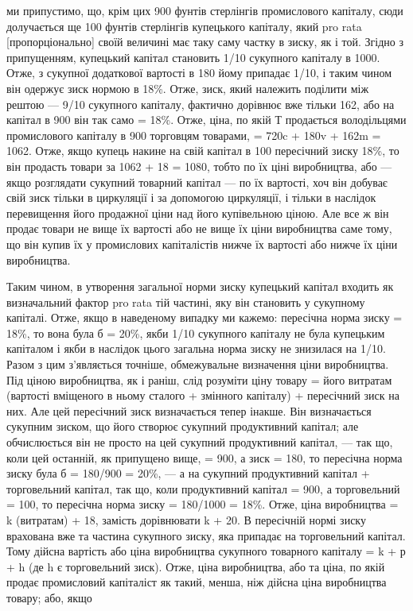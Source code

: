 ми припустимо, що, крім цих 900 фунтів стерлінгів промислового
капіталу, сюди долучається ще 100 фунтів стерлінгів купецького
капіталу, який pro rata [пропорціонально] своїй величині має
таку саму частку в зиску, як і той. Згідно з припущенням,
купецький капітал становить 1/10 сукупного капіталу в 1000.
Отже, з сукупної додаткової вартості в 180 йому припадає 1/10,
і таким чином він одержує зиск нормою в 18\%. Отже, зиск,
який належить поділити між рештою — 9/10 сукупного капіталу,
фактично дорівнює вже тільки 162, або на капітал в 900 він так
само = 18\%. Отже, ціна, по якій Т продається володільцями промислового
капіталу в 900 торговцям товарами, = 720c + 180v + 162m = 1062.
Отже, якщо купець накине на свій капітал
в 100 пересічний зиску 18\%, то він продасть товари за 1062 + 18 = 1080,
тобто по їх ціні виробництва, або — якщо розглядати
сукупний товарний капітал — по їх вартості, хоч він добуває
свій зиск тільки в циркуляції і за допомогою циркуляції, і тільки
в наслідок перевищення його продажної ціни над його купівельною
ціною. Але все ж він продає товари не вище їх вартості
або не вище їх ціни виробництва саме тому, що він купив їх
у промислових капіталістів нижче їх вартості або нижче їх ціни
виробництва.

Таким чином, в утворення загальної норми зиску купецький
капітал входить як визначальний фактор pro rata тій частині,
яку він становить у сукупному капіталі. Отже, якщо в наведеному
випадку ми кажемо: пересічна норма зиску = 18\%, то вона
була б = 20\%, якби 1/10 сукупного капіталу не була купецьким
капіталом і якби в наслідок цього загальна норма зиску не знизилася
на 1/10. Разом з цим з’являється точніше, обмежувальне визначення
ціни виробництва. Під ціною виробництва, як і раніш,
слід розуміти ціну товару = його витратам (вартості вміщеного
в ньому сталого + змінного капіталу) + пересічний зиск на них.
Але цей пересічний зиск визначається тепер інакше. Він визначається
сукупним зиском, що його створює сукупний продуктивний
капітал; але обчислюється він не просто на цей сукупний
продуктивний капітал, — так що, коли цей останній, як
припущено вище, = 900, а зиск = 180, то пересічна норма зиску
була б = 180/900 = 20\%, — а на сукупний продуктивний капітал + торговельний
капітал, так що, коли продуктивний капітал = 900, а торговельний = 100, то пересічна норма зиску =
180/1000 = 18\%.
Отже, ціна виробництва = k (витратам) + 18, замість дорівнювати
k + 20. В пересічній нормі зиску врахована вже та частина
сукупного зиску, яка припадає на торговельний капітал. Тому
дійсна вартість або ціна виробництва сукупного товарного капіталу
= k + р + h (де h є торговельний зиск). Отже, ціна виробництва,
або та ціна, по якій продає промисловий капіталіст як
такий, менша, ніж дійсна ціна виробництва товару; або, якщо
